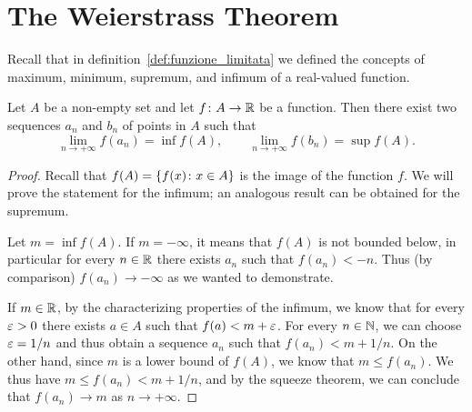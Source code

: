 \section{The Weierstrass Theorem}

Recall that in definition~\ref{def:funzione_limitata} we defined the concepts of
maximum, minimum, supremum, and infimum of a real-valued function.

\begin{lemma}%
%
%
%
Let $A$ be a non-empty set and let $f\colon A \to {\mathbb R}$ be a function. Then there
exist two sequences $a_n$ and $b_n$ of points in $A$ such that
\[
  \lim_{n\to +\infty} f(a_n) = \inf f(A), \qquad
  \lim_{n\to +\infty} f(b_n) = \sup f(A).
\]
\end{lemma}
%
\begin{proof}
Recall that $f(A) = {\left\{ f(x)\colon x \in A \right\}}$ is the image of the function
$f$. We will prove the statement for the infimum; an analogous result can be
obtained for the supremum.

Let $m=\inf f(A)$.
If $m=-\infty$, it means that $f(A)$ is not bounded below, in particular for
every $n\in {\mathbb R}$ there exists $a_n$ such that $f(a_n) < - n$.
Thus (by comparison) $f(a_n) \to -\infty$ as we wanted to demonstrate.

If $m\in {\mathbb R}$, by the characterizing properties of the infimum, we know that for
every $\varepsilon>0$ there exists $a\in A$ such that $f(a) < m + \varepsilon$.
For every $n\in{\mathbb N}$, we can choose $\varepsilon=1/n$ and thus obtain a sequence $a_n$
such that $f(a_n) < m + 1/n$.
On the other hand, since $m$ is a lower bound of $f(A)$, we know that $m \le
f(a_n)$.
We thus have $m \le f(a_n) < m+ 1/n$, and by the squeeze theorem, we can
conclude that $f(a_n) \to m$ as $n\to +\infty$.
\end{proof}


